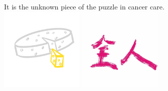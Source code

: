 \documentclass[
paper=landscape,
paper=160mm:90mm, %
fontsize=11pt, %
pagesize, %
parskip=half-, %
]{scrartcl} %
\theoremstyle{mythmstyle} %
\begin{document}
It is the unknown piece of the puzzle in cancer care.\\
\includegraphics[width=4cm]{piece.jpg}
\includegraphics[width=4cm]{holistic_全人.pdf}
\end{document}
